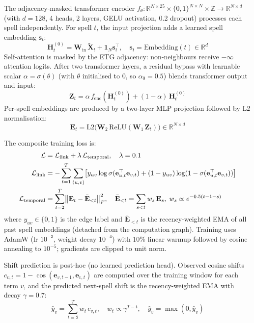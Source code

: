 \documentclass[12pt]{article}
\begin{document}
The adjacency-masked transformer encoder $f_\theta : \mathbb{R}^{N \times 25} \times \{0,1\}^{N \times N} \times \mathbb{Z} \rightarrow \mathbb{R}^{N \times d}$ (with $d = 128$, 4 heads, 2 layers, GELU activation, 0.2 dropout) processes each spell independently. For spell $t$, the input projection adds a learned spell embedding $\mathbf{s}_t$:
\begin{equation}
  \mathbf{H}_t^{(0)} = \mathbf{W}_{\text{in}}\,\tilde{\mathbf{X}}_t + \mathbf{1}_N \mathbf{s}_t^\top, \quad \mathbf{s}_t = \text{Embedding}(t) \in \mathbb{R}^d
\end{equation}
Self-attention is masked by the ETG adjacency: non-neighbours receive $-\infty$ attention logits. After two transformer layers, a residual bypass with learnable scalar $\alpha = \sigma(\theta)$ (with $\theta$ initialised to $0$, so $\alpha_0 = 0.5$) blends transformer output and input:
\begin{equation}
  \mathbf{Z}_t = \alpha\, f_{\text{enc}}(\mathbf{H}_t^{(0)}) + (1-\alpha)\, \mathbf{H}_t^{(0)}
\end{equation}
Per-spell embeddings are produced by a two-layer MLP projection followed by L2 normalisation:
\begin{equation}
  \mathbf{E}_t = \text{L2}\!\bigl(\mathbf{W}_2\, \text{ReLU}(\mathbf{W}_1\, \mathbf{Z}_t)\bigr) \in \mathbb{R}^{N \times d}
\end{equation}

The composite training loss is:
\begin{align}
  \mathcal{L} &= \mathcal{L}_{\text{link}} + \lambda\,\mathcal{L}_{\text{temporal}}, \quad \lambda = 0.1 \notag \\
  \mathcal{L}_{\text{link}} &= -\sum_{t=1}^{T}\sum_{(u,v)}\bigl[y_{uv}\log\sigma(\mathbf{e}_{u,t}^\top \mathbf{e}_{v,t}) + (1-y_{uv})\log(1-\sigma(\mathbf{e}_{u,t}^\top \mathbf{e}_{v,t}))\bigr] \notag \\
  \mathcal{L}_{\text{temporal}} &= \sum_{t=2}^{T} \bigl\|\mathbf{E}_t - \bar{\mathbf{E}}_{<t}\bigr\|_F^2, \quad \bar{\mathbf{E}}_{<t} = \sum_{s<t} w_s\,\mathbf{E}_s,\; w_s \propto e^{-0.5(t-1-s)}
\end{align}
where $y_{uv} \in \{0,1\}$ is the edge label and $\bar{\mathbf{E}}_{<t}$ is the recency-weighted EMA of all past spell embeddings (detached from the computation graph). Training uses AdamW (lr $10^{-3}$, weight decay $10^{-4}$) with 10\% linear warmup followed by cosine annealing to $10^{-5}$; gradients are clipped to unit norm.

Shift prediction is post-hoc (no learned prediction head). Observed cosine shifts $c_{v,t} = 1 - \cos(\mathbf{e}_{v,t-1}, \mathbf{e}_{v,t})$ are computed over the training window for each term $v$, and the predicted next-spell shift is the recency-weighted EMA with decay $\gamma = 0.7$:
\begin{equation}
  \hat{y}_v = \sum_{t=2}^{T} w_t\, c_{v,t}, \quad w_t \propto \gamma^{T-t}, \quad \hat{y}_v = \max(0, \hat{y}_v)
\end{equation}
\end{document}
